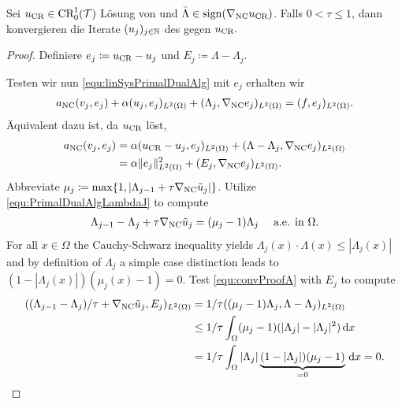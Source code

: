 \begin{theorem}
  Sei $u_\textup{CR}\in \textup{CR}^1_0(\mathcal{T})$ Lösung von 
  und $\bar\Lambda\in\operatorname{sign}(\nabla_\textup{NC}u_\textup{CR})$.
  Falls $0 < \tau \leq 1$, dann konvergieren die Iterate $(u_j)_{j\in\mathbb{N}}$ des
  gegen $u_\textup{CR}.$
\end{theorem}

\begin{proof}
  Definiere $e_j \coloneqq u_\textup{CR}-u_j$ und $E_j\coloneqq
  \Lambda-\Lambda_j$.

  Testen wir nun \eqref{equ:linSysPrimalDualAlg} mit $e_j$ erhalten wir
  \begin{align*}
    a_\textup{NC}(v_j,e_j) + \alpha(u_j,e_j)_{L^2(\Omega)} 
    + (\Lambda_j,\nabla_\textup{NC} e_j)_{L^2(\Omega)}
    = 
    (f,e_j)_{L^2(\Omega)}.
  \end{align*}
  Äquivalent dazu ist, da $u_\textup{CR}$  löst, 
  \begin{align}
    \label{equ:convProofE}
    a_\textup{NC}(v_j,e_j) &= 
    \alpha(u_\textup{CR}-u_j,e_j)_{L^2(\Omega)} 
    + (\Lambda-\Lambda_j,\nabla_\textup{NC} e_j)_{L^2(\Omega)} \notag\\
    &= 
    \alpha\Vert e_j\Vert_{L^2(\Omega)}^2
    + (E_j,\nabla_\textup{NC} e_j)_{L^2(\Omega)}.
  \end{align}
  Abbreviate $\mu_j\coloneqq \max\{1,|\Lambda_{j-1}+\tau
  \nabla_\textup{NC} \tilde{u}_j|\}$.
  Utilize \eqref{equ:PrimalDualAlgLambdaJ} to compute
  \begin{align}
    \label{equ:convProofA}
    \Lambda_{j-1}-\Lambda_j+\tau \nabla_\textup{NC} \tilde{u}_j 
    = (\mu_j-1)\Lambda_j \quad\text{ a.e. in }\Omega.
  \end{align}
  For all $x\in\Omega$ the Cauchy-Schwarz inequality yields
  $\Lambda_j(x)\cdot\Lambda(x)\leq|\Lambda_j(x)|$ 
  and by definition of $\Lambda_j$ a simple case distinction leads to
  $(1-|\Lambda_j(x)|)(\mu_j(x)-1)=0$.
  Test \eqref{equ:convProofA} with $E_j$ to compute
  \begin{align*}
    ( (\Lambda_{j-1}-\Lambda_j)/\tau+\gradnc \tilde{u}_j,
    E_j)_{L^2(\Omega)}
    &= 
    1/\tau ( (\mu_j-1)\Lambda_j,\Lambda-\Lambda_j)_{L^2(\Omega)}\\
    &\leq
    1/\tau \int_\Omega (\mu_j-1)(|\Lambda_j|-|\Lambda_j|^2)\,\mathrm dx\\
    &=
    1/\tau \int_\Omega |\Lambda_j|
    \underbrace{(1-|\Lambda_j|)(\mu_j-1)}_{=0}\,\mathrm dx =0.

\end{align*}
\end{proof}
